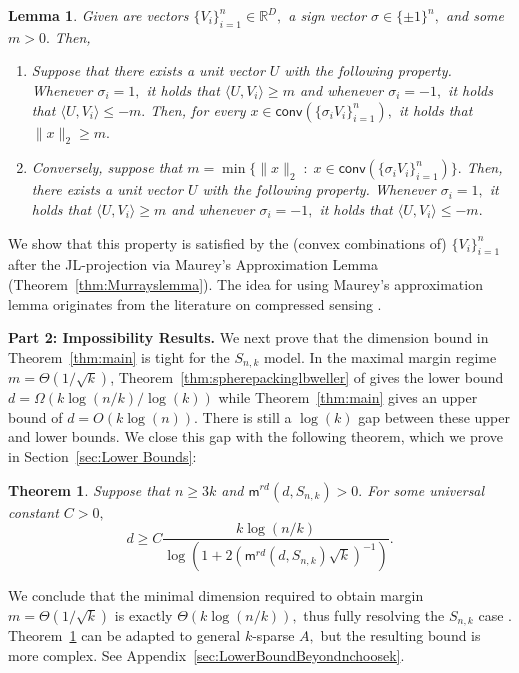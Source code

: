\documentclass[preprint]{article}
\newtheorem{theorem}{Theorem}[section]
\newtheorem{lemma}{Lemma}[]
\newcommand{\maxmargin}{\mathsf{m}^{rd}}
\newcommand{\ksparsen}{S_{n,k}}
\newcommand{\conv}{\mathsf{conv}}
\begin{document}
\begin{lemma}
\label{lem:convexhullequivalentofmargin}
Given are vectors $\{V_i\}_{i = 1}^n\in \mathbb{R}^D,$ a sign vector $\sigma\in \{\pm1\}^n,$ and some $m>0.$ Then, 
\begin{enumerate}
    \item [$(\Longrightarrow)$] Suppose that there exists a unit vector $U$ with the following property. Whenever $\sigma_i = 1,$ it holds that $\langle U, V_i\rangle \ge m$ and whenever $\sigma_i = -1,$ it holds that $\langle U, V_i\rangle \le -m.$ Then, for every $x\in \conv(\{\sigma_i V_i\}_{i = 1}^n),$ it holds that $\|x\|_2\ge m.$
    \item [$(\Longleftarrow)$] Conversely, suppose that $m = \min\big\{\|x\|_2\; : \; x \in \conv(\{\sigma_i V_i\}_{i = 1}^n)\big\}.$ Then, there exists a unit vector $U$ with the following property. Whenever $\sigma_i = 1,$ it holds that $\langle U, V_i\rangle \ge m$ and whenever $\sigma_i = -1,$ it holds that $\langle U, V_i\rangle \le -m.$
\end{enumerate}
\end{lemma}

We show that this property is satisfied by the (convex combinations of) $\{V_i\}_{i = 1}^n$ after the JL-projection via Maurey's Approximation Lemma (Theorem~\ref{thm:Murrayslemma}). The idea for using Maurey's approximation lemma originates from the literature on compressed sensing \cite{foucart2010gelfand,foucart2013mathematical,novak1995optimal}. 

\textbf{Part 2: Impossibility Results.} We next prove that the dimension bound in Theorem~\ref{thm:main} is tight for the $\ksparsen$ model. In the maximal margin regime $m = \Theta(1/\sqrt{k})$, Theorem~\ref{thm:spherepackinglbweller} of \cite{weller2025theoretical} gives the lower bound $d=\Omega(k\log(n/k)/\log(k))$ while Theorem~\ref{thm:main} gives an upper bound of $d = O(k\log(n))$. There is still a $\log(k)$ gap between these upper and lower bounds. We close this gap with the following theorem, which we prove in Section~\ref{sec:Lower Bounds}:

\begin{theorem}
\label{thm:mainlowerbound} Suppose that $n\ge 3k$ and 
$\maxmargin(d, \ksparsen)>0.$
For some universal constant $C>0,$
$$
d\ge C\frac{k\log (n/k)}{\log(1 + 2(\maxmargin(d, \ksparsen)\sqrt{k})^{-1})}.
$$
\end{theorem}
We conclude that the minimal dimension required to obtain margin $m = \Theta(1/\sqrt{k})$ is exactly $\Theta(k\log(n/k)),$ thus fully resolving the $\ksparsen$ case \cite{weller2025theoretical}. Theorem~\ref{thm:mainlowerbound} can be adapted to general $k$-sparse $A,$ but the resulting bound is more complex. See Appendix~\ref{sec:LowerBoundBeyondnchoosek}.
\end{document}
